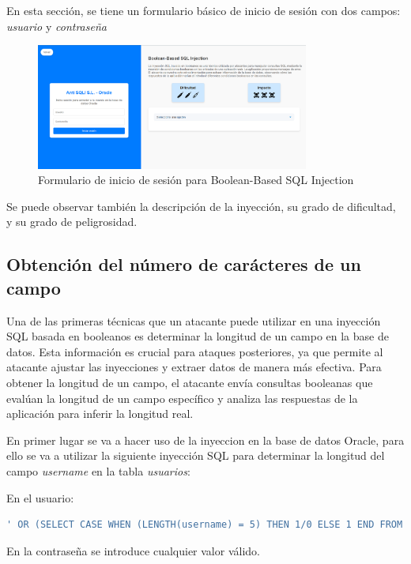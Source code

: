 \documentclass[a4paper,12pt]{article}
\begin{document}
En esta sección, se tiene un formulario básico de inicio de sesión con dos campos: \textit{usuario} y \textit{contraseña}

\begin{figure}[H]
    \centering
    \includegraphics[width=0.8\textwidth]{Imagenes/BooleanSQLILab.png}
    \caption{Formulario de inicio de sesión para Boolean-Based SQL Injection}
\end{figure}

Se puede observar también la descripción de la inyección, su grado de dificultad, y su grado de peligrosidad.


\subsection{Obtención del número de carácteres de un campo}

Una de las primeras técnicas que un atacante puede utilizar en una inyección SQL basada en booleanos es determinar la longitud de un campo en la base de datos. Esta información es crucial para ataques posteriores, ya que permite al atacante ajustar las inyecciones y extraer datos de manera más efectiva. Para obtener la longitud de un campo, el atacante envía consultas booleanas que evalúan la longitud de un campo específico y analiza las respuestas de la aplicación para inferir la longitud real.

En primer lugar se va a hacer uso de la inyeccion en la base de datos Oracle, para ello se va a utilizar la siguiente inyección SQL para determinar la longitud del campo \textit{username} en la tabla \textit{usuarios}:

En el usuario:

\begin{lstlisting}[language=SQL]
   ' OR (SELECT CASE WHEN (LENGTH(username) = 5) THEN 1/0 ELSE 1 END FROM (SELECT username, ROWNUM AS rn FROM Usuarios) WHERE rn=1) = 1 --
\end{lstlisting}

En la contraseña se introduce cualquier valor válido.
\end{document}
